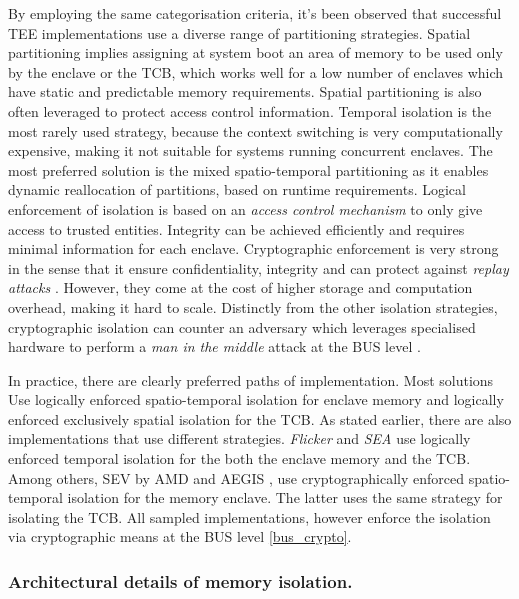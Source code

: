 \documentclass[runningheads,a4paper]{uwsese}
\begin{document}
By employing the same categorisation criteria, it's been observed that
successful TEE implementations use a diverse range of partitioning strategies.
Spatial partitioning implies assigning at system boot an area of memory to be
used only by the enclave or the TCB, which works well for a low number of
enclaves which have static and predictable memory requirements. Spatial
partitioning is also often leveraged to protect access control information.
Temporal isolation is the most rarely used strategy, because the context
switching is very computationally expensive, making it not suitable for systems
running concurrent enclaves. The most preferred solution is the mixed
spatio-temporal partitioning as it enables dynamic reallocation of partitions,
based on runtime requirements. Logical enforcement of isolation is based on an
\emph{access control mechanism} \label{acc_control} to only give access to
trusted entities. Integrity can be achieved efficiently and requires minimal
information for each enclave. Cryptographic enforcement is very strong in the
sense that it ensure confidentiality, integrity and can protect against
\emph{replay attacks} \cite{tee_replay_attacks}. However, they come at the cost
of higher storage and computation overhead, making it hard to scale. Distinctly
from the other isolation strategies, cryptographic isolation can counter an
adversary which leverages specialised hardware to perform a \emph{man in the
middle} attack at the BUS level \cite{tee_hw_sup} \label{bus_crypto}.

In practice, there are clearly preferred paths of implementation. Most
solutions Use logically enforced spatio-temporal isolation for enclave memory
and logically enforced exclusively spatial isolation for the TCB. As stated
earlier, there are also implementations that use different strategies.
\emph{Flicker} \cite{flicker} and \emph{SEA} \cite{sea_minimal_tcb} use
logically enforced temporal isolation for the both the enclave memory and the
TCB. Among others, SEV \cite{amd_sev} by AMD and AEGIS \cite{aegis}, use
cryptographically enforced spatio-temporal isolation for the memory enclave.
The latter uses the same strategy for isolating the TCB. All sampled
implementations, however enforce the isolation via cryptographic means at the
BUS level \ref{bus_crypto}.

\subsubsection{Architectural details of memory isolation.}
\end{document}
